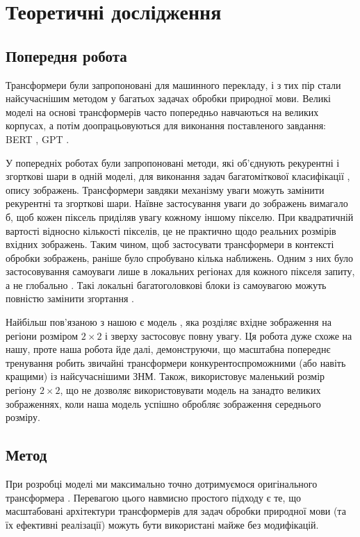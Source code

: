 \chapter{Теоретичні дослідження}
\section{Попередня робота}
Трансформери були запропоновані \cite{attention-all-need}
для машинного перекладу, і з тих пір стали
найсучаснішим методом у багатьох задачах обробки природної
мови. Великі моделі на основі трансформерів
часто попередньо навчаються на великих корпусах, а потім
доопрацьовуються для виконання поставленого завдання:
BERT \cite{bert}, GPT \cite{gpt}.

У попередніх роботах були запропоновані методи, які об'єднують
рекурентні і згорткові шари в одній моделі, для виконання задач
багатоміткової класифікації \cite{nn:cnn-rnn}, опису зображень.
Трансформери завдяки механізму уваги можуть
замінити рекурентні та згорткові шари. Наївне застосування
уваги до зображень вимагало б, щоб кожен піксель приділяв
увагу кожному іншому пікселю. При квадратичній вартості відносно кількості
пікселів, це не практично щодо реальних розмірів
вхідних зображень. Таким чином, щоб застосувати
трансформери в контексті обробки зображень,
раніше було спробувано кілька наближень. Одним з них
було застосовування самоуваги лише в локальних
регіонах для кожного пікселя запиту, а не глобально \cite{image-trans}.
Такі локальні багатоголовкові блоки із самоувагою
можуть повністю замінити згортання \cite{local-regions-attention}.

Найбільш пов’язаною з нашою є модель \cite{cordonnier},
яка розділяє вхідне зображення на регіони розміром
$2 \times 2$ і зверху застосовує повну увагу. Ця робота
дуже схоже на нашу, проте наша робота йде далі,
демонструючи, що масштабна попереднє тренування
робить звичайні трансформери
конкурентоспроможними (або навіть кращими) із найсучаснішими ЗНМ.
Також, \cite{cordonnier} використовує маленький розмір
регіону $2 \times 2$, що не дозволяє використовувати модель
на занадто великих зображеннях, коли наша модель успішно обробляє
зображення середнього розміру.

\section{Метод}

При розробці моделі ми максимально точно дотримуємося
оригінального трансформера \cite{attention-all-need}.
Перевагою цього навмисно простого підходу
є те, що масштабовані архітектури трансформерів
для задач обробки природної мови (та їх ефективні реалізації)
можуть бути використані майже без модифікацій.

